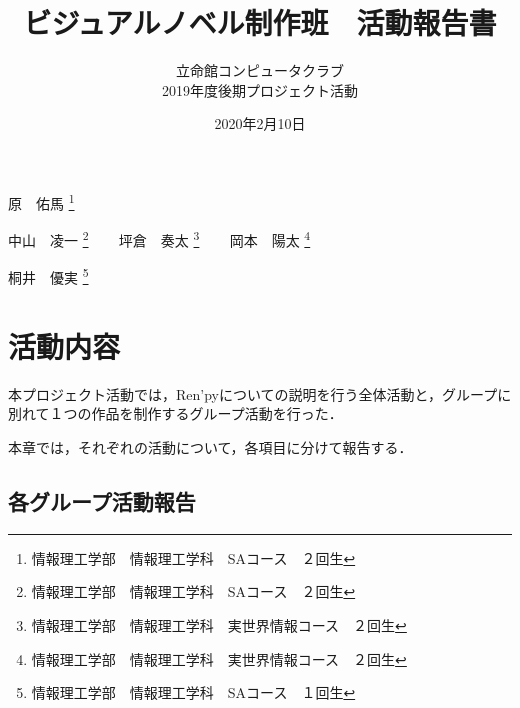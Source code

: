 \documentclass[a4paper]{jarticle}
\title{ビジュアルノベル制作班　活動報告書}
\author{立命館コンピュータクラブ\\2019年度後期プロジェクト活動}
\date{2020年2月10日}
\begin{document}
  \maketitle

  \begin{center}
    原　佑馬 \footnote{情報理工学部　情報理工学科　SAコース　２回生}

    中山　凌一 \footnote{情報理工学部　情報理工学科　SAコース　２回生}
    ~~~
    坪倉　奏太 \footnote{情報理工学部　情報理工学科　実世界情報コース　２回生}
    ~~~
    岡本　陽太 \footnote{情報理工学部　情報理工学科　実世界情報コース　２回生}
    
    桐井　優実 \footnote{情報理工学部　情報理工学科　SAコース　１回生}
  \end{center}

  \newpage
  \tableofcontents
  \newpage

  
  
  \section{活動内容}

    本プロジェクト活動では，Ren'pyについての説明を行う全体活動と，グループに別れて１つの作品を制作するグループ活動を行った．
      
    本章では，それぞれの活動について，各項目に分けて報告する．

    

    


    

    \subsection{各グループ活動報告}

      

      

      

    

    
\end{document}
